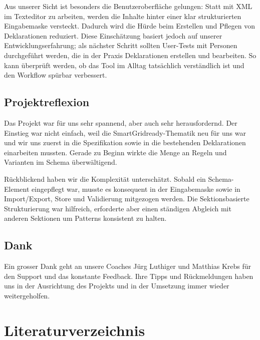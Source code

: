 \documentclass[a4paper,12pt]{article}
\begin{document}
Aus unserer Sicht ist besonders die Benutzeroberfläche gelungen: Statt mit XML im Texteditor zu arbeiten, werden 
die Inhalte hinter einer klar strukturierten Eingabemaske versteckt. Dadurch wird die Hürde beim Erstellen und Pflegen 
von Deklarationen reduziert. Diese Einschätzung basiert jedoch auf unserer Entwicklungserfahrung; als 
nächster Schritt sollten User-Tests mit Personen durchgeführt werden, die in der Praxis Deklarationen erstellen 
und bearbeiten. So kann überprüft werden, ob das Tool im Alltag tatsächlich verständlich ist und den Workflow 
spürbar verbessert.

\subsection{Projektreflexion}

Das Projekt war für uns sehr spannend, aber auch sehr herausfordernd. Der Einstieg war nicht einfach, weil die 
SmartGridready-Thematik neu für uns war und wir uns zuerst in die Spezifikation sowie in die bestehenden 
Deklarationen einarbeiten mussten. Gerade zu Beginn wirkte die Menge an Regeln und Varianten im Schema 
überwältigend.

Rückblickend haben wir die Komplexität unterschätzt. Sobald ein Schema-Element eingepflegt war, musste es 
konsequent in der Eingabemaske sowie in Import/Export, Store und Validierung mitgezogen werden. Die Sektionsbasierte 
Strukturierung war hilfreich, erforderte aber einen ständigen Abgleich mit anderen Sektionen um Patterns konsistent zu halten.

\subsection{Dank}

Ein grosser Dank geht an unsere Coaches Jürg Luthiger und Matthias Krebs für den Support und das konstante 
Feedback. Ihre Tipps und Rückmeldungen haben uns in der Ausrichtung des Projekts und in der Umsetzung immer 
wieder weitergeholfen.

\newpage

\section{Literaturverzeichnis}
\end{document}

